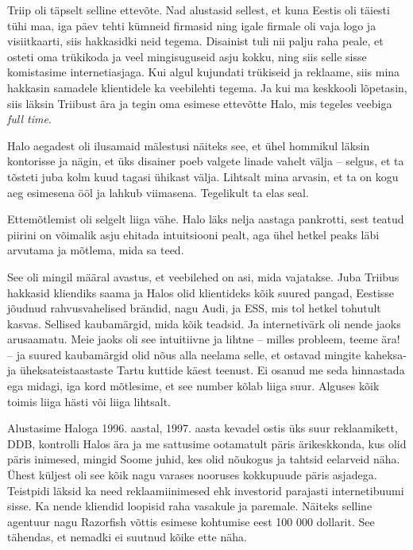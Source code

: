 Triip oli täpselt selline ettevõte. Nad alustasid sellest, et kuna Eestis oli 
täiesti tühi maa, iga päev tehti kümneid firmasid ning igale firmale oli vaja logo 
ja visiitkaarti, siis hakkasidki neid tegema. Disainist tuli nii palju raha peale, 
et osteti oma trükikoda ja veel mingisuguseid asju kokku, ning siis selle 
sisse komistasime internetiasjaga. Kui algul kujundati trükiseid ja 
reklaame, siis mina hakkasin samadele klientidele ka veebilehti tegema. Ja 
kui ma keskkooli lõpetasin, siis läksin Triibust 
ära ja tegin oma esimese ettevõtte 
Halo, mis tegeles veebiga \emph{full time}. 

Halo aegadest oli ilusamaid mälestusi näiteks see, et ühel hommikul läksin 
kontorisse ja nägin, et üks disainer poeb valgete linade vahelt välja --
selgus, et ta tõsteti juba kolm kuud tagasi ühikast välja. Lihtsalt mina 
arvasin, et ta on kogu aeg esimesena ööl ja lahkub viimasena. Tegelikult ta 
elas seal.


Ettemõtlemist oli selgelt liiga vähe. Halo läks nelja 
aastaga pankrotti, sest teatud piirini on võimalik asju ehitada intuitsiooni 
pealt, aga ühel hetkel peaks läbi arvutama ja mõtlema, mida sa 
teed. 

See oli mingil määral avastus, et veebilehed on asi, mida vajatakse. 
Juba Triibus hakkasid kliendiks saama ja Halos olid 
klientideks kõik suured pangad, Eestisse jõudnud rahvusvahelised 
brändid, nagu Audi, ja ESS, mis tol hetkel tohutult 
kasvas. Sellised kaubamärgid, mida kõik teadsid. Ja internetivärk 
oli nende jaoks arusaamatu. Meie jaoks oli see intuitiivne ja lihtne -- 
milles probleem, teeme ära! -- ja suured kaubamärgid olid 
nõus alla neelama selle, et ostavad mingite kaheksa- ja 
üheksateistaastaste Tartu kuttide käest teenust. Ei osanud me seda hinnastada 
ega midagi, iga kord mõtlesime, et see number kõlab liiga 
suur. Alguses kõik toimis liiga hästi või liiga lihtsalt. 

Alustasime Haloga 1996. aastal, 1997. aasta kevadel ostis üks suur reklaamikett, 
DDB, kontrolli Halos ära ja me sattusime ootamatult päris 
ärikeskkonda, kus olid päris inimesed, mingid Soome juhid, kes olid nõukogus ja 
tahtsid eelarveid näha. Ühest küljest oli 
see kõik nagu varases nooruses kokkupuude päris asjadega. Teistpidi läksid ka 
need reklaamiinimesed ehk investorid
parajasti internetibuumi sisse. Ka nende kliendid loopisid raha vasakule ja 
paremale. Näiteks selline agentuur nagu Razorfish võttis  esimese 
kohtumise eest 100 000 dollarit. See tähendas, et nemadki ei 
suutnud kõike ette näha. 


